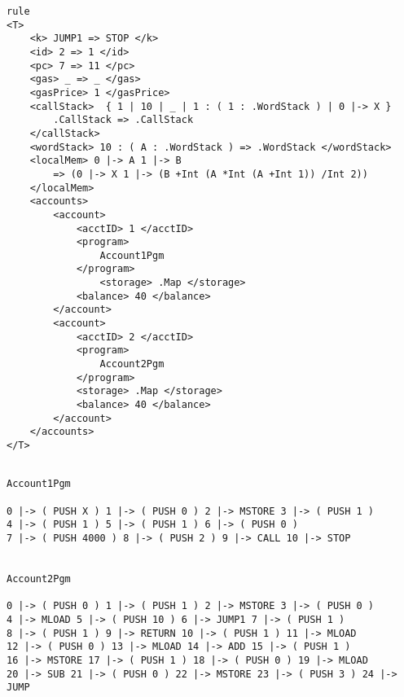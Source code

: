 \begin{verbatim}
rule
<T> 
    <k> JUMP1 => STOP </k> 
    <id> 2 => 1 </id> 
    <pc> 7 => 11 </pc> 
    <gas> _ => _ </gas>
    <gasPrice> 1 </gasPrice> 
    <callStack>  { 1 | 10 | _ | 1 : ( 1 : .WordStack ) | 0 |-> X } 
        .CallStack => .CallStack  
    </callStack> 
    <wordStack> 10 : ( A : .WordStack ) => .WordStack </wordStack>
    <localMem> 0 |-> A 1 |-> B 
        => (0 |-> X 1 |-> (B +Int (A *Int (A +Int 1)) /Int 2)) 
    </localMem>
    <accounts>
        <account>     
            <acctID> 1 </acctID> 
            <program>
                Account1Pgm 
            </program>
                <storage> .Map </storage>
            <balance> 40 </balance> 
        </account>
        <account>
            <acctID> 2 </acctID> 
            <program> 
                Account2Pgm
            </program>  
            <storage> .Map </storage>
            <balance> 40 </balance> 
        </account>
    </accounts>
</T>

\end{verbatim}
\begin{verbatim}

Account1Pgm

0 |-> ( PUSH X ) 1 |-> ( PUSH 0 ) 2 |-> MSTORE 3 |-> ( PUSH 1 )
4 |-> ( PUSH 1 ) 5 |-> ( PUSH 1 ) 6 |-> ( PUSH 0 ) 
7 |-> ( PUSH 4000 ) 8 |-> ( PUSH 2 ) 9 |-> CALL 10 |-> STOP 

            
Account2Pgm

0 |-> ( PUSH 0 ) 1 |-> ( PUSH 1 ) 2 |-> MSTORE 3 |-> ( PUSH 0 ) 
4 |-> MLOAD 5 |-> ( PUSH 10 ) 6 |-> JUMP1 7 |-> ( PUSH 1 ) 
8 |-> ( PUSH 1 ) 9 |-> RETURN 10 |-> ( PUSH 1 ) 11 |-> MLOAD 
12 |-> ( PUSH 0 ) 13 |-> MLOAD 14 |-> ADD 15 |-> ( PUSH 1 ) 
16 |-> MSTORE 17 |-> ( PUSH 1 ) 18 |-> ( PUSH 0 ) 19 |-> MLOAD 
20 |-> SUB 21 |-> ( PUSH 0 ) 22 |-> MSTORE 23 |-> ( PUSH 3 ) 24 |-> JUMP
\end{verbatim}
